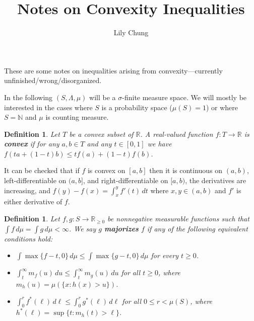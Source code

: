 \documentclass{article}
\title{Notes on Convexity Inequalities}
\author{Lily Chung}
\date{}
\newtheorem{definition}[theorem]{Definition}
\newcommand*{\defn}[1]{\textbf{#1}}
\newcommand*{\N}[0]{\mathbb{N}}
\newcommand*{\R}[0]{\mathbb{R}}
\def\[#1\]{\begin{align*}#1\end{align*}}
\begin{document}
\maketitle

These are some notes on inequalities arising from convexity---currently unfinished/wrong/disorganized.

In the following $(S, \Lambda, \mu)$ will be a $\sigma$-finite measure space.
We will mostly be interested in the cases where $S$ is a probability space ($\mu(S) = 1$) or where $S = \N$ and $\mu$ is counting measure.

\begin{definition}
  Let $T$ be a convex subset of $\R$.
  A real-valued function $f : T \to \R$ is \defn{convex} if for any $a, b \in T$ and any $t \in [0, 1]$ we have $f(ta + (1 - t)b) \le tf(a) + (1 - t)f(b)$.
\end{definition}

It can be checked that if $f$ is convex on $[a, b]$ then it is continuous on $(a, b)$, left-differentiable on $(a, b]$, and right-differentiable on $[a, b)$, the derivatives are increasing, and $f(y) - f(x) = \int_x^y f'(t)\,dt$ where $x, y \in (a, b)$ and $f'$ is either derivative of $f$.



\begin{definition}
  Let $f, g : S \to \R_{\ge 0}$ be nonnegative measurable functions such that $\int f\,d\mu = \int g\,d\mu < \infty$.
  We say $g$ \defn{majorizes} $f$ if any of the following equivalent conditions hold:
  \begin{itemize}
  \item $\int \max\{f - t, 0\}\,d\mu \le \int \max\{g - t, 0\}\,d\mu$ for every $t \ge 0$.
  \item $\int_t^\infty m_f(u)\,du \le \int_t^\infty m_g(u)\,du$ for all $t \ge 0$, where $m_h(u) = \mu(\{x : h(x) > u\})$.
  \item $\int_0^r f^*(\ell)\,d\ell \le \int_0^r g^*(\ell)\,d\ell$ for all $0 \le r < \mu(S)$, where $h^*(\ell) = \sup\{t : m_h(t) > \ell\}$.
  \end{itemize}
\end{definition}
\end{document}
